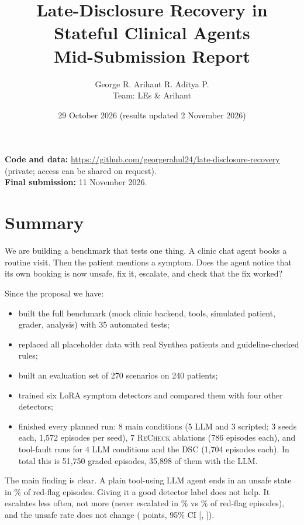 \documentclass[10pt]{article}
\title{Late-Disclosure Recovery in Stateful Clinical Agents\\[2pt]
\large Mid-Submission Report}
\author{George R. \quad Arihant R. \quad Aditya P.\\ Team: LEs \& Arihant}
\date{29 October 2026 (results updated 2 November 2026)}
\newcommand{\recheck}{\textsc{ReCheck}}
\begin{document}
\maketitle

\noindent\textbf{Code and data:} \url{https://github.com/georgerahul24/late-disclosure-recovery} (private; access can be shared on request).\\
\textbf{Final submission:} 11 November 2026.

\section{Summary}
We are building a benchmark that tests one thing. A clinic chat agent books a routine visit. Then the patient mentions a symptom. Does the agent notice that its own booking is now unsafe, fix it, escalate, and check that the fix worked?

Since the proposal we have:
\begin{itemize}
\item built the full benchmark (mock clinic backend, tools, simulated patient, grader, analysis) with 35 automated tests;
\item replaced all placeholder data with real Synthea patients and guideline-checked rules;
\item built an evaluation set of 270 scenarios on 240 patients;
\item trained six LoRA symptom detectors and compared them with four other detectors;
\item finished every planned run: 8 main conditions (5 LLM and 3 scripted; 3 seeds each, 1{,}572 episodes per seed), 7 \recheck{} ablations (786 episodes each), and tool-fault runs for 4 LLM conditions and the DSC (1{,}704 episodes each). In total this is 51{,}750 graded episodes, 35{,}898 of them with the LLM.
\end{itemize}

\noindent The main finding is clear. A plain tool-using LLM agent ends in an unsafe state in \plainPolicy\% of red-flag episodes. Giving it a good detector label does not help. It escalates less often, not more (never escalated in \plainlabelLenient\% vs \plainLenient\% of red-flag episodes), and the unsafe rate does not change ( points, 95\% CI [, ]).
\end{document}
